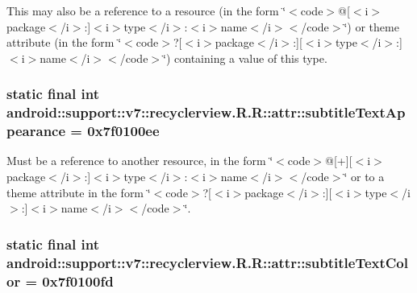 This may also be a reference to a resource (in the form \char`\"{}$<$code$>$@\mbox{[}$<$i$>$package$<$/i$>$:\mbox{]}$<$i$>$type$<$/i$>$:$<$i$>$name$<$/i$>$$<$/code$>$\char`\"{}) or theme attribute (in the form \char`\"{}$<$code$>$?\mbox{[}$<$i$>$package$<$/i$>$:\mbox{]}\mbox{[}$<$i$>$type$<$/i$>$:\mbox{]}$<$i$>$name$<$/i$>$$<$/code$>$\char`\"{}) containing a value of this type. \hypertarget{classandroid_1_1support_1_1v7_1_1recyclerview_1_1_r_1_1attr_50f5853ab06d7b11cbd5762a661dfbed}{
\subsubsection[{subtitleTextAppearance}]{\setlength{\rightskip}{0pt plus 5cm}static final int android::support::v7::recyclerview.R.R::attr::subtitleTextAppearance = 0x7f0100ee}}
\label{classandroid_1_1support_1_1v7_1_1recyclerview_1_1_r_1_1attr_50f5853ab06d7b11cbd5762a661dfbed}


Must be a reference to another resource, in the form \char`\"{}$<$code$>$@\mbox{[}+\mbox{]}\mbox{[}$<$i$>$package$<$/i$>$:\mbox{]}$<$i$>$type$<$/i$>$:$<$i$>$name$<$/i$>$$<$/code$>$\char`\"{} or to a theme attribute in the form \char`\"{}$<$code$>$?\mbox{[}$<$i$>$package$<$/i$>$:\mbox{]}\mbox{[}$<$i$>$type$<$/i$>$:\mbox{]}$<$i$>$name$<$/i$>$$<$/code$>$\char`\"{}. \hypertarget{classandroid_1_1support_1_1v7_1_1recyclerview_1_1_r_1_1attr_0d603e8a1bb930c7640ba351924d5bd3}{
\subsubsection[{subtitleTextColor}]{\setlength{\rightskip}{0pt plus 5cm}static final int android::support::v7::recyclerview.R.R::attr::subtitleTextColor = 0x7f0100fd}}
\label{classandroid_1_1support_1_1v7_1_1recyclerview_1_1_r_1_1attr_0d603e8a1bb930c7640ba351924d5bd3}


